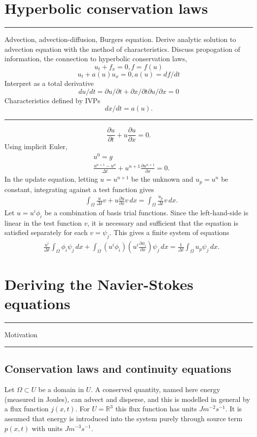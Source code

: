 \documentclass[11pt,a4paper]{memoir}
\newcommand{\pdf}[2]{\frac{\partial #1}{\partial #2}}
\newcommand{\todo}[1]{\vskip 0.1in \hrule \vskip 0.03in {#1} \vskip 0.03in \hrule \vskip 0.1in}
\begin{document}
\section{Hyperbolic conservation laws}
\todo{
Advection, advection-diffusion, Burgers equation.
Derive analytic solution to advection equation with the method of characteristics.
Discuss propogation of information, the connection to hyperbolic conservation laws,
$$u_t + f_x = 0, f = f(u)$$
$$u_t + a(u)u_x = 0, a(u) = df/dt$$
Interpret as a total derivative
$$du/dt = \partial u /\partial t + \partial x / \partial t \partial u / \partial x = 0$$
Characteristics defined by IVPs
$$dx/dt = a(u).$$
}
\begin{equation}
    \pdf{u}{t} + u\pdf{u}{x} = 0.
\end{equation}
Using implicit Euler,
\begin{align*}
    &u^0 = g \\
    &\frac{u^{n+1} - u^n}{\Delta t} + u^{n+1}\pdf{u^{n+1}}{x} = 0.
\end{align*}
In the update equation, letting $u = u^{n+1}$ be the unknown and $u_p = u^n$ be constant, integrating against a test function gives
\begin{align*}
    &\int_\Omega \frac{u}{\Delta t}v + u\pdf{u}{x}v\,dx = \int_\Omega \frac{u_p}{\Delta t} v\,dx.
\end{align*}
Let $u = u^i\phi_i$ be a combination of basis trial functions. Since the left-hand-side is linear in the test function $v$, it is necessary and sufficient
that the equation is satisfied separately for each $v = \psi_j$. This gives a finite system of equations
\begin{align*}
    &\frac{u^i}{\Delta t}\int_\Omega \phi_i\psi_j\,dx + \int_{\Omega} (u^i\phi_i)(u^i \pdf{\phi_i}{x})\psi_j\,dx = \frac{1}{\Delta t}\int_\Omega u_p \psi_j\,dx.
\end{align*}




\section{Deriving the Navier-Stokes equations}
\todo{Motivation}
\subsection{Conservation laws and continuity equations} %
Let $\Omega \subset U$ be a domain in $U$. A conserved quantity, named here energy (measured in Joules), can advect and disperse, and this is modelled in general by
a flux function $j(x, t)$. For $U = \mathbb{R}^3$ this flux function has units $Jm^{-2}s^{-1}$.
It is assumed that energy is introduced into
the system purely through source term $p(x, t)$ with units $Jm^{-3}s^{-1}$.
\end{document}
